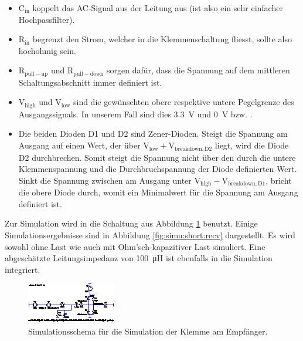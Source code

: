 \begin{itemize}
    \tightlist
    \item
        $\mathrm{C_{in}}$ koppelt das AC-Signal aus  der Leitung aus (ist also
        ein sehr einfacher Hochpassfilter).
    \item
        $\mathrm{R_{in}}$ begrenzt den Strom,  welcher in die Klemmenschaltung
        fliesst, sollte also hochohmig sein.
    \item
        $\mathrm{R_{pull-up}}$  und  $\mathrm{R_{pull-down}}$ sorgen  daf\"ur,
        dass  die   Spannung  auf  dem  mittleren   Schaltungsabschnitt  immer
        definiert ist.
    \item
        $\mathrm{V_{high}}$  und  $\mathrm{V_{low}}$  sind  die  gew\"unschten
        obere  respektive untere  Pegelgrenze des  Ausgangssignals. In unserem
        Fall sind dies \SI{3.3}{\volt} und \SI{0}{\volt} bzw. .
    \item
        Die   beiden  Dioden   D1   und  D2   sind  Zener-Dioden. Steigt   die
        Spannung  am Ausgang  auf einen  Wert, der  \"uber $\mathrm{V_{low}  +
        V_{breakdown,D2}}$ liegt, wird die Diode D2 durchbrechen. Somit steigt
        die Spannung nicht \"uber den durch die untere Klemmenspannung und die
        Durchbruchspannung  der  Diode  definierten Wert. Sinkt  die  Spannung
        zwischen  am  Ausgang  unter $\mathrm{V_{high}  -  V_{breakdown,D1}}$,
        bricht die obere Diode durch, womit ein Minimalwert f\"ur die Spannung
        am Ausgang definiert ist.
\end{itemize}

Zur   Simulation  wird   in     die   Schaltung  aus   Abbildung
\ref{fig:ltspice:shortCircuit:receiver}  benutzt. Einige Simulationsergebnisse
sind in  Abbildung \ref{fig:simu:short:recv} dargestellt. Es wird  sowohl ohne
Last  wie auch  mit  Ohm'sch-kapazitiver  Last simuliert. Eine  abgesch\"atzte
Leitungsimpedanz von  \SI{100}{\micro\henry} ist  ebenfalls in  die Simulation
integriert.

\begin{figure}[h!tb]
    \centering
    \includegraphics[width=\textwidth]{images/ltspice/jac/shortcircuit-recv.eps}
    \caption[-Schema f\"ur Klemmenschaltung]{
        Simulationsschema f\"ur die Simulation  der Klemme am Empf\"anger.%
    }
    \label{fig:ltspice:shortCircuit:receiver}
\end{figure}

